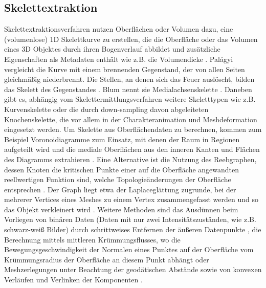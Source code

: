 \subsection*{Skelettextraktion}
Skelettextraktionsverfahren nutzen Oberflächen oder Volumen dazu, eine (volumenlose) 1D Skelettkurve zu erstellen, die die Oberfläche oder das Volumen eines 3D Objektes durch ihren Bogenverlauf abbildet und zusätzliche Eigenschaften als Metadaten enthält wie z.B. die Volumendicke \cite{au2008skeletonExtractionbyMeshContraction}. Palágyi vergleicht die Kurve mit einem brennenden Gegenstand, der von allen Seiten gleichmäßig niederbrennt. Die Stellen, an denen sich das Feuer auslöscht, bilden das Skelett des Gegenstandes \cite{palagyi2008parallelSurfaceThinning}. Blum nennt sie Medialachsenskelette \cite{blum1967descriptorsOfShape}. Daneben gibt es, abhängig vom Skelettermittlungsverfahren weitere Skeletttypen wie z.B. Kurvenskelette \cite{dey2006CurveSkeletonsMedialGeodesicFunction} \cite{cornea2007curveSkeletonProperties} oder die durch down-sampling davon abgeleiteten Knochenskelette, die vor allem in der Charakteranimation \cite{wang2007envelopingRotiationalRegression} und Meshdeformation \cite{weber2007contextAwareSkeletalShapeDeformation} eingesetzt werden.
Um Skelette aus Oberflächendaten zu berechnen, kommen zum Beispiel Voronoidiagramme zum Einsatz, mit denen der Raum in Regionen aufgeteilt wird und die mediale Oberflächen aus den inneren Kanten und Flächen des Diagramms extrahieren \cite{dey2006CurveSkeletonsMedialGeodesicFunction}. Eine Alternative ist die Nutzung des Reebgraphen, dessen Knoten die kritischen Punkte einer auf die Oberfläche angewandten reellwertigen Funktion sind, welche Topologieänderungen der Oberfläche entsprechen \cite{pascucci2007computationReebGraph}. Der Graph liegt etwa der Laplaceglättung zugrunde, bei der mehrerer Vertices eines Meshes zu einem Vertex zusammengefasst werden und so das Objekt verkleinert wird \cite{au2008skeletonExtractionbyMeshContraction}. Weitere Methoden sind das Ausdünnen beim Vorliegen von binären Daten (Daten mit nur zwei Intensitätszuständen, wie z.B. schwarz-weiß Bilder) durch schrittweises Entfernen der äußeren Datenpunkte \cite{palagyi2008parallelSurfaceThinning}, die Berechnung mittels mittleren Krümmungsflusses, wo die Bewegungsgeschwindigkeit der Normalen eines Punktes auf der Oberfläche vom Krümmungsradius der Oberfläche an diesem Punkt abhängt \cite{tagliasacchi2012meanCurvatureSkeletons} oder Meshzerlegungen unter Beachtung der geodätischen Abstände sowie von konvexen Verläufen und Verlinken der Komponenten \cite{katz2003meshDecomposition}.
